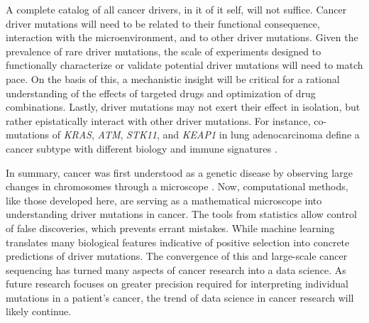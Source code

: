 A complete catalog of all cancer drivers, in it of it self, will not suffice. Cancer driver mutations will need to be related to their functional consequence, interaction with the microenvironment, and to other driver mutations. Given the prevalence of rare driver mutations, the scale of experiments designed to functionally characterize or validate potential driver mutations will need to match pace. On the basis of this, a mechanistic insight will be critical for a rational understanding of the effects of targeted drugs and optimization of drug combinations. Lastly, driver mutations may not exert their effect in isolation, but rather epistatically interact with other driver mutations. For instance, co-mutations of \textit{KRAS}, \textit{ATM}, \textit{STK11}, and \textit{KEAP1} in lung adenocarcinoma define a cancer subtype with different biology and immune signatures \cite{RN191}.

In summary, cancer was first understood as a genetic disease by observing large changes in chromosomes through a microscope \cite{RN18}. Now, computational methods, like those developed here, are serving as a mathematical microscope into understanding driver mutations in cancer. The tools from statistics allow control of false discoveries, which prevents errant mistakes. While machine learning translates many biological features indicative of positive selection into concrete predictions of driver mutations. The convergence of this and large-scale cancer sequencing has turned many aspects of cancer research into a data science. As future research focuses on greater precision required for interpreting individual mutations in a patient's cancer, the trend of data science in cancer research will likely continue.
